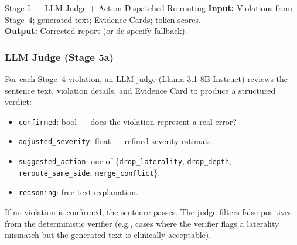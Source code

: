 \documentclass[11pt,a4paper]{article}
\begin{document}
\begin{stagebox}{Stage 5 --- LLM Judge + Action-Dispatched Re-routing}
\textcolor{inputcolor}{\textbf{Input:}} Violations from Stage~4; generated text; Evidence Cards; token scores.\\
\textcolor{outputcolor}{\textbf{Output:}} Corrected report (or de-specify fallback).
\end{stagebox}

\subsubsection{LLM Judge (Stage 5a)}
For each Stage~4 violation, an LLM judge (Llama-3.1-8B-Instruct) reviews the sentence text, violation details, and Evidence Card to produce a structured verdict:
\begin{itemize}[nosep]
    \item \texttt{confirmed}: bool --- does the violation represent a real error?
    \item \texttt{adjusted\_severity}: float --- refined severity estimate.
    \item \texttt{suggested\_action}: one of \{\texttt{drop\_laterality}, \texttt{drop\_depth}, \texttt{reroute\_same\_side}, \texttt{merge\_conflict}\}.
    \item \texttt{reasoning}: free-text explanation.
\end{itemize}
If no violation is confirmed, the sentence passes. The judge filters false positives from the deterministic verifier (e.g., cases where the verifier flags a laterality mismatch but the generated text is clinically acceptable).
\end{document}

